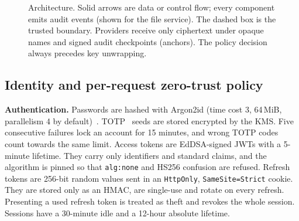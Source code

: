 \documentclass[conference]{IEEEtran}
\newcommand{\code}[1]{\texttt{\small #1}}
\begin{document}
\begin{figure}[t]
\caption{Architecture. Solid arrows are data or control flow; every component emits audit events (shown for the file service). The dashed box is the trusted boundary. Providers receive only ciphertext under opaque names and signed audit checkpoints (anchors). The policy decision always precedes key unwrapping.}
\label{fig:arch}
\end{figure}

\subsection{Identity and per-request zero-trust policy}
\textbf{Authentication.} Passwords are hashed with Argon2id (time cost 3, 64\,MiB, parallelism 4 by default)~\cite{rfc9106}. TOTP~\cite{rfc6238} seeds are stored encrypted by the KMS. Five consecutive failures lock an account for 15 minutes, and wrong TOTP codes count towards the same limit. Access tokens are EdDSA-signed JWTs with a 5-minute lifetime. They carry only identifiers and standard claims, and the algorithm is pinned so that \code{alg:none} and HS256 confusion are refused. Refresh tokens are 256-bit random values sent in an \code{HttpOnly}, \code{SameSite=Strict} cookie. They are stored only as an HMAC, are single-use and rotate on every refresh. Presenting a used refresh token is treated as theft and revokes the whole session. Sessions have a 30-minute idle and a 12-hour absolute lifetime.
\end{document}
